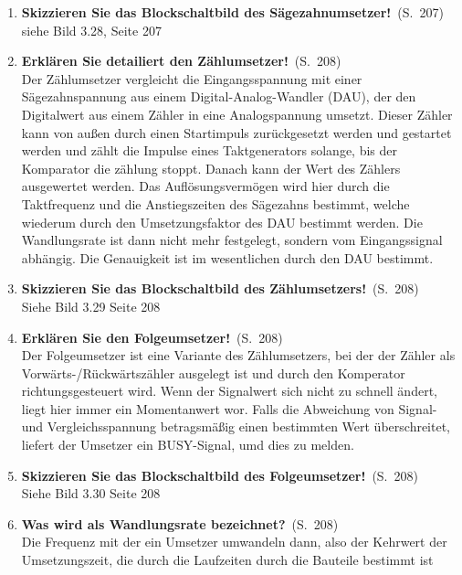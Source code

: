 \documentclass[a4paper,12pt]{article}
\newcommand{\question}[3]{\pagebreak[3]\item {\textbf{#1?}}\ (S.\ #2)#3}
\newcommand{\statement}[3]{\pagebreak[3]\item {\textbf{#1!}}\ (S.\ #2)#3}
\newcommand{\normaltext}[1]{\\#1}
\newcommand{\page}[1]{#1}
\begin{document}
\begin{enumerate}
  \statement{Skizzieren Sie das Blockschaltbild des Sägezahnumsetzer}{\page{207}}
  {
    \normaltext{siehe Bild 3.28, Seite 207}
  }

  \statement{Erklären Sie detailiert den Zählumsetzer}{\page{208}}
  {
    \normaltext{Der Zählumsetzer vergleicht die Eingangsspannung mit einer Sägezahnspannung
                aus einem Digital-Analog-Wandler (DAU), der den Digitalwert aus einem Zähler
                in eine Analogspannung umsetzt. Dieser Zähler kann von außen durch einen
                Startimpuls zurückgesetzt werden und gestartet werden und zählt die Impulse
                eines Taktgenerators solange, bis der Komparator die zählung stoppt. Danach
                kann der Wert des Zählers ausgewertet werden. Das Auflösungsvermögen wird hier
                durch die Taktfrequenz und die Anstiegszeiten des Sägezahns bestimmt, welche
                wiederum durch den Umsetzungsfaktor des DAU bestimmt werden. Die Wandlungsrate
                ist dann nicht mehr festgelegt, sondern vom Eingangssignal abhängig. Die
                Genauigkeit ist im wesentlichen durch den DAU bestimmt.}
  }

  \statement{Skizzieren Sie das Blockschaltbild des Zählumsetzers} {\page{208}}
  {
    \normaltext{Siehe Bild 3.29 Seite 208}
  }

  \statement{Erklären Sie den Folgeumsetzer}{\page{208}}
  {
    \normaltext{Der Folgeumsetzer ist eine Variante des Zählumsetzers, bei der der Zähler als
                Vorwärts-/Rückwärtszähler ausgelegt ist und durch den Komperator richtungsgesteuert wird.
                Wenn der Signalwert sich nicht zu schnell ändert, liegt hier immer ein Momentanwert wor.
                Falls die Abweichung von Signal- und Vergleichsspannung betragsmäßig einen bestimmten Wert
                überschreitet, liefert der Umsetzer ein BUSY-Signal, umd dies zu melden.}
  }

  \statement{Skizzieren Sie das Blockschaltbild des Folgeumsetzer} {\page{208}}
  {
    \normaltext{Siehe Bild 3.30 Seite 208}
  }

  \question{Was wird als Wandlungsrate bezeichnet}{\page{208}}
  {
    \normaltext{Die Frequenz mit der ein Umsetzer umwandeln dann, also der Kehrwert der
                Umsetzungszeit, die durch die Laufzeiten durch die Bauteile bestimmt ist}
  }


\end{enumerate}
\end{document}

